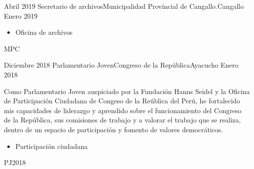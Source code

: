 \begin{experiences}
  \experience
  {Abril 2019} {Secretario de archivos}{Municipalidad Provincial de Cangallo.}{Cangallo}
  {Enero 2019}    {
    \begin{itemize}
      \item Oficina de archivos
    \end{itemize}
  }
  {MPC}
  \emptySeparator

  \experience
  {Diciembre 2018}  {Parlamentario Joven}{Congreso de la República}{Ayacucho}
  {Enero 2018}   {
    Como Parlamentario Joven auspiciado por la Fundación Hanns Seidel y la Oficina de Participación Ciudadana de Congeso de la Reública del Perú, he fortalecido mis capacidades de liderazgo y aprendido sobre el funcionamiento del Congreso de la República, sus comisiones de trabajo y a valorar el trabajo que se realiza, dentro de un espacio de participación y fomento de valores democráticos.
    \begin{itemize}
      \item Participación ciudadana
    \end{itemize}
  }
  {PJ2018}

\end{experiences}


